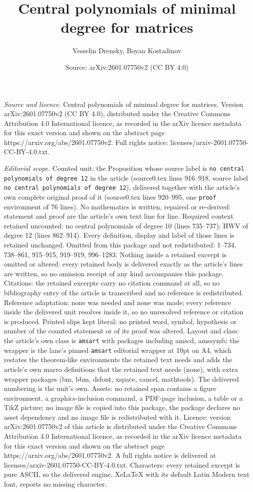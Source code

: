 \documentclass[10pt,a4paper]{amsart}
\title[Central polynomials of minimal degree for matrices]{Central polynomials of minimal degree for matrices}
\author{Vesselin Drensky, Boyan Kostadinov}
\date{Source: arXiv:2601.07750v2 (CC BY 4.0)}
\begin{document}
\maketitle

\noindent\emph{Source and licence.} Central polynomials of minimal degree for matrices. Version arXiv:2601.07750v2 (CC BY 4.0), distributed under the Creative Commons Attribution 4.0 International licence, as recorded in the arXiv licence metadata for this exact version and shown on the abstract page https://arxiv.org/abs/2601.07750v2. Full rights notice: licenses/arxiv-2601.07750-CC-BY-4.0.txt.\par\smallskip

\noindent\textit{Editorial scope.} Counted unit: the Proposition whose source label is \texttt{no central polynomials of degree 12} in the article (source0.tex lines 916--918, source label \texttt{no central polynomials of degree 12}), delivered together with the article's own complete original proof of it (source0.tex lines 920--995, one \texttt{proof} environment of 76 lines). No mathematics is written, repaired or re-derived: statement and proof are the article's own text line for line. Required context retained uncounted: no central polynomials of degree 10 (lines 735--737); HWV of degree 12 (lines 862--914). Every definition, display and label of those lines is retained unchanged. Omitted from this package and not redistributed: 1--734, 738--861, 915--915, 919--919, 996--1283. Nothing inside a retained excerpt is omitted or altered: every retained body is delivered exactly as the article's lines are written, so no omission receipt of any kind accompanies this package. Citations: the retained excerpts carry no citation command at all, so no bibliography entry of the article is transcribed and no reference is redistributed. Reference adaptation: none was needed and none was made; every reference inside the delivered unit resolves inside it, so no unresolved reference or citation is produced. Printed slips kept literal: no printed word, symbol, hypothesis or number of the counted statement or of its proof was altered. Layout and class: the article's own class is \texttt{amsart} with packages including amscd, amssymb; the wrapper is the lane's pinned \texttt{amsart} editorial wrapper at 10pt on A4, which restates the theorem-like environments the retained text needs and adds the article's own macro definitions that the retained text needs (none), with extra wrapper packages (bm, bbm, dsfont, xspace, cancel, mathtools). The delivered numbering is the unit's own. Assets: no retained span contains a figure environment, a graphics-inclusion command, a PDF-page inclusion, a table or a TikZ picture; no image file is copied into this package, the package declares no asset dependency and no image file is redistributed with it. Licence: version arXiv:2601.07750v2 of this article is distributed under the Creative Commons Attribution 4.0 International licence, as recorded in the arXiv licence metadata for this exact version and shown on the abstract page https://arxiv.org/abs/2601.07750v2. A full rights notice is delivered at licenses/arxiv-2601.07750-CC-BY-4.0.txt. Characters: every retained excerpt is pure ASCII, so the delivered engine, XeLaTeX with its default Latin Modern text font, reports no missing character.
\end{document}
